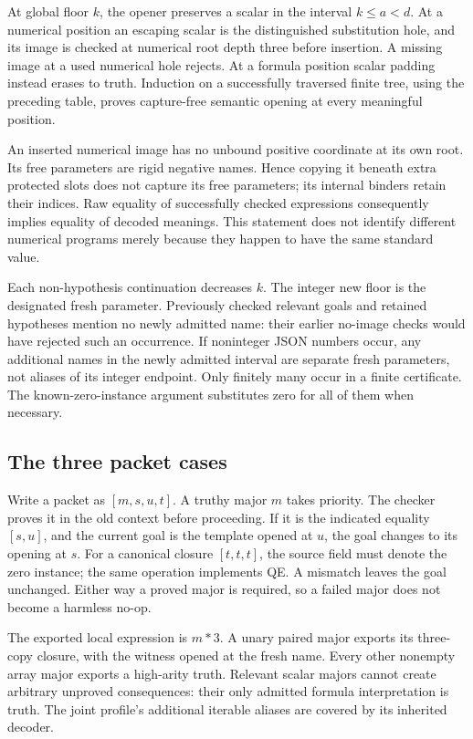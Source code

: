 \documentclass[11pt,letterpaper]{article}
\theoremstyle{definition}\newtheorem{definition}[theorem]{Definition}
\theoremstyle{remark}\newtheorem{remark}[theorem]{Remark}
\begin{document}
At global floor $k$, the opener preserves a scalar in the interval
$k\leq a<d$. At a numerical position an escaping scalar is the
distinguished substitution hole, and its image is checked at numerical
root depth three before insertion. A missing image at a used numerical
hole rejects. At a formula position scalar padding instead erases to
truth. Induction on a successfully traversed finite tree, using the
preceding table, proves capture-free semantic opening at every
meaningful position.

An inserted numerical image has no unbound positive coordinate at its
own root. Its free parameters are rigid negative names. Hence copying
it beneath extra protected slots does not capture its free parameters;
its internal binders retain their indices. Raw equality of successfully
checked expressions consequently implies equality of decoded meanings.
This statement does not identify different numerical programs merely
because they happen to have the same standard value.

Each non-hypothesis continuation decreases $k$. The integer new floor is
the designated fresh parameter. Previously checked relevant goals and
retained hypotheses mention no newly admitted name: their earlier
no-image checks would have rejected such an occurrence. If noninteger
JSON numbers occur, any additional names in the newly admitted interval
are separate fresh parameters, not aliases of its integer endpoint.
Only finitely many occur in a finite certificate. The known-zero-instance
argument substitutes zero for all of them when necessary.

\subsection{The three packet cases}

Write a packet as $[m,s,u,t]$. A truthy major $m$ takes priority. The
checker proves it in the old context before proceeding. If it is the
indicated equality $[s,u]$, and the current goal is the template opened
at $u$, the goal changes to its opening at $s$. For a canonical closure
$[t,t,t]$, the source field must denote the zero instance; the same
operation implements QE. A mismatch leaves the goal unchanged. Either
way a proved major is required, so a failed major does not become a
harmless no-op.

The exported local expression is $m*3$. A unary paired major exports
its three-copy closure, with the witness opened at the fresh name.
Every other nonempty array major exports a high-arity truth. Relevant
scalar majors cannot create arbitrary unproved consequences: their
only admitted formula interpretation is truth. The joint profile's
additional iterable aliases are covered by its inherited decoder.
\end{document}
